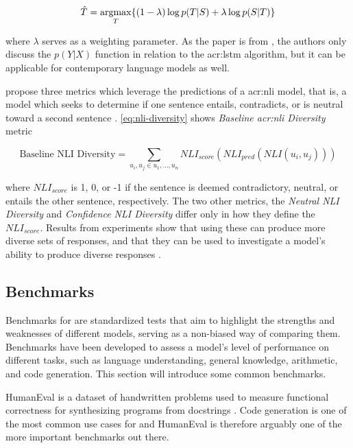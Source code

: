 \begin{equation}
    \hat{T} = \operatorname*{argmax}_{T} \{ (1 - \lambda) \log p(T|S) + \lambda \log p(S|T) \}
\end{equation}

\noindent where $\lambda$ serves as a weighting parameter. As the paper is from \citeyear{liDiversityPromotingObjectiveFunction2016}, the authors only discuss the $p(Y|X)$ function in relation to the \gls{acr:lstm} algorithm, but it can be applicable for contemporary language models as well.

\cite{stasaskiSemanticDiversityDialogue2022} propose three metrics which leverage the predictions of a \gls{acr:nli} model, that is, a model which seeks to determine if one sentence entails, contradicts, or is neutral toward a second  sentence \citep[1]{stasaskiSemanticDiversityDialogue2022}. \eqref{eq:nli-diversity} shows \textit{Baseline \acrshort{acr:nli} Diversity} metric

\begin{equation}
    \text{Baseline NLI Diversity} = \sum_{u_i,u_j \in u_1,...,u_n} NLI_{score}(NLI_{pred}(NLI(u_i, u_j)))
    \label{eq:nli-diversity}
\end{equation}

where $NLI_{score}$ is 1, 0, or -1 if the sentence is deemed contradictory, neutral, or entails the other sentence, respectively. The two other metrics, the \textit{Neutral NLI Diversity} and \textit{Confidence NLI Diversity} differ only in how they define the $NLI_{score}$. Results from experiments show that using these can produce more diverse sets of responses, and that they can be used to investigate a model's ability to produce diverse responses \citep[9]{stasaskiSemanticDiversityDialogue2022}.

\subsection{Benchmarks}\label{subsec:benchmarks}

Benchmarks for  are standardized tests that aim to highlight the strengths and weaknesses of different models, serving as a non-biased way of comparing them. Benchmarks have been developed to assess a model's level of performance on different tasks, such as language understanding, general knowledge, arithmetic, and code generation. This section will introduce some common benchmarks.

HumanEval is a dataset of handwritten problems used to measure functional correctness for synthesizing programs from docstrings \citep[2-4]{chenEvaluatingLargeLanguage2021}. Code generation is one of the most common use cases for  and HumanEval is therefore arguably one of the more important benchmarks out there.


